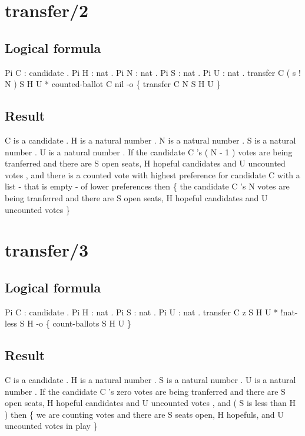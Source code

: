 \section{transfer/2}
\subsection{Logical formula}
\begin{texto2}
	Pi C : candidate . Pi H : nat . Pi N : nat . Pi S : nat . Pi U : nat . transfer C ( s ! N ) S H U * counted-ballot C nil -o \{  transfer C N S H U  \}
\end{texto2}

\subsection{Result}
\begin{texto2}
	C is a candidate . H is a natural number . N is a natural number . S is a natural number . U is a natural number . If the candidate C 's ( N - 1 ) votes are being tranferred and there are S open seats, H hopeful candidates and U uncounted votes , and there is a counted vote with highest preference for candidate C with a list - that is empty - of lower preferences then \{ the candidate C 's N votes are being tranferred and there are S open seats, H hopeful candidates and U uncounted votes \}
\end{texto2}

\section{transfer/3}
\subsection{Logical formula}
\begin{texto2}
	Pi C : candidate . Pi H : nat . Pi S : nat . Pi U : nat . transfer C z S H U * !nat-less S H -o \{ count-ballots S H U \}
\end{texto2}

\subsection{Result}
\begin{texto2}
	C is a candidate . H is a natural number . S is a natural number . U is a natural number . If the candidate C 's zero votes are being tranferred and there are S open seats, H hopeful candidates and U uncounted votes , and ( S is less than H ) then \{ we are counting votes and there are S seats open, H hopefuls, and U uncounted votes in play \}
\end{texto2}

